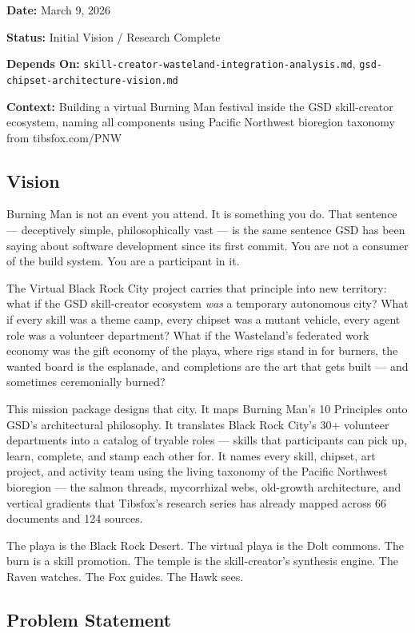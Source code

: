 \documentclass[11pt,letterpaper]{article}
\newcommand{\metafield}[2]{\textbf{\sffamily #1} #2\par}
\begin{document}
\metafield{Date:}{March 9, 2026}
\metafield{Status:}{Initial Vision / Research Complete}
\metafield{Depends On:}{\texttt{skill-creator-wasteland-integration-analysis.md}, \texttt{gsd-chipset-architecture-vision.md}}
\metafield{Context:}{Building a virtual Burning Man festival inside the GSD skill-creator ecosystem, naming all components using Pacific Northwest bioregion taxonomy from tibsfox.com/PNW}

\subsection{Vision}

Burning Man is not an event you attend. It is something you do. That sentence --- deceptively simple, philosophically vast --- is the same sentence GSD has been saying about software development since its first commit. You are not a consumer of the build system. You are a participant in it.

The Virtual Black Rock City project carries that principle into new territory: what if the GSD skill-creator ecosystem \emph{was} a temporary autonomous city? What if every skill was a theme camp, every chipset was a mutant vehicle, every agent role was a volunteer department? What if the Wasteland's federated work economy was the gift economy of the playa, where rigs stand in for burners, the wanted board is the esplanade, and completions are the art that gets built --- and sometimes ceremonially burned?

This mission package designs that city. It maps Burning Man's 10 Principles onto GSD's architectural philosophy. It translates Black Rock City's 30+ volunteer departments into a catalog of tryable roles --- skills that participants can pick up, learn, complete, and stamp each other for. It names every skill, chipset, art project, and activity team using the living taxonomy of the Pacific Northwest bioregion --- the salmon threads, mycorrhizal webs, old-growth architecture, and vertical gradients that Tibsfox's research series has already mapped across 66 documents and 124 sources.

The playa is the Black Rock Desert. The virtual playa is the Dolt commons. The burn is a skill promotion. The temple is the skill-creator's synthesis engine. The Raven watches. The Fox guides. The Hawk sees.

\subsection{Problem Statement}
\end{document}
